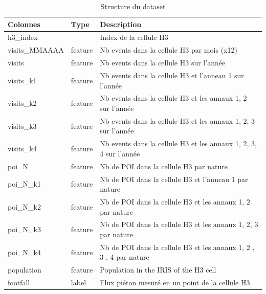 \begin{table}[H]
    \centering
    \begin{tabular}{|l|l|l|}
    \hline
    \textbf{Colonnes}    & \textbf{Type} & \textbf{Description}                                                    \\ \hline
    h3\_index            &               & Index de la cellule H3                                                  \\ \hline
    visits\_MMAAAA & feature       & Nb events dans la cellule H3 par mois (x12)                        \\ \hline
    visits        & feature       & Nb events dans la cellule H3 sur l'année                          \\ \hline
    visits\_k1     & feature       & Nb events dans la cellule H3 et l'anneau 1 sur l'année            \\ \hline
    visits\_k2     & feature       & Nb events dans la cellule H3 et les annaux 1, 2 sur l'année       \\ \hline
    visits\_k3     & feature       & Nb events dans la cellule H3 et les annaux 1, 2, 3 sur l'année    \\ \hline
    visits\_k4     & feature       & Nb events dans la cellule H3 et les annaux 1, 2, 3, 4 sur l'année \\ \hline
    poi\_N        & feature       & Nb de POI dans la cellule H3 par nature                                 \\ \hline
    poi\_N\_k1    & feature       & Nb de POI dans la cellule H3 et l'anneau 1 par nature                   \\ \hline
    poi\_N\_k2    & feature       & Nb de POI dans la cellule H3 et les annaux 1, 2 par nature              \\ \hline
    poi\_N\_k3    & feature       & Nb de POI dans la cellule H3 et les annaux 1, 2, 3 par nature           \\ \hline
    poi\_N\_k4    & feature       & Nb de POI dans la cellule H3 et les annaux 1, 2 , 3 , 4 par nature      \\ \hline
    population           & feature       & Population in the IRIS of the H3 cell                                   \\ \hline
    footfall             & label         & Flux piéton mesuré en un point de la cellule H3                         \\ \hline
    \end{tabular}
    \caption{Structure du dataset}
    \end{table}

